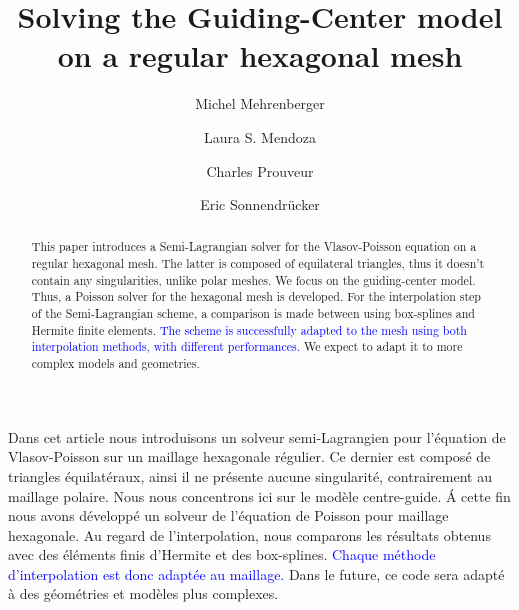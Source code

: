 \documentclass[proc]{edpsmath}
\begin{document}

\title{Solving the Guiding-Center model\\on a regular hexagonal mesh}%
%
\author{Michel Mehrenberger} \address{IRMA, Universit\'e de Strasbourg, 7, rue Ren\'e Descartes, 67084 Strasbourg \& INRIA-Nancy Grand-Est, projet TONUS, 
}
\author{Laura S. Mendoza} \address{Max-Planck-Institut f\"{u}r Plasmaphysik, Boltzmannstr. 2, D-85748 Garching, } 
\author{Charles Prouveur}\address{...} %
\author{Eric Sonnendr\"{u}cker}
%
%


\begin{abstract} 
This paper introduces a Semi-Lagrangian solver for the Vlasov-Poisson equation on a regular hexagonal mesh. The latter is composed of equilateral triangles, thus it doesn't contain any singularities, unlike polar meshes. We focus on the guiding-center model. Thus, a Poisson solver for the hexagonal mesh is developed. For the interpolation step of the Semi-Lagrangian scheme, a comparison is made between using box-splines and Hermite finite elements. \textcolor{blue}{The scheme is successfully adapted to the mesh using both interpolation methods, with different performances.} We expect to adapt it to more complex models and geometries.
\end{abstract}

\begin{resume} 
Dans cet article nous introduisons un solveur semi-Lagrangien pour l'\'equation de Vlasov-Poisson sur un maillage hexagonale r\'egulier. Ce dernier est compos\'e de triangles \'equilat\'eraux, ainsi il ne pr\'esente aucune singularit\'e, contrairement au maillage polaire. Nous nous concentrons ici sur le mod\`ele centre-guide. \'A cette fin nous avons d\'evelopp\'e un solveur de l'\'equation de Poisson pour maillage hexagonale. Au regard de l'interpolation, nous comparons les r\'esultats obtenus avec des \'el\'ements finis d'Hermite et des box-splines. \textcolor{blue}{Chaque m\'ethode d'interpolation est donc adapt\'ee au maillage.} Dans le future, ce code sera adapt\'e \`a des g\'eom\'etries et mod\`eles plus complexes.  
\end{resume}
\end{document}
